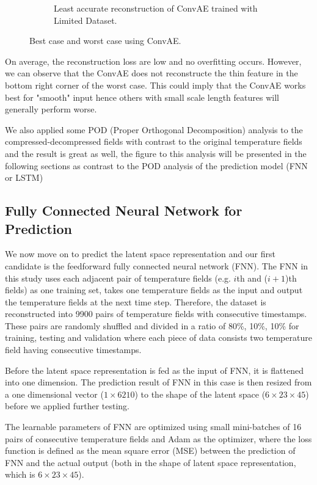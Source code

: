 \begin{figure}[H]
\begin{subfigure}{0.45\textwidth}
    \caption{Least accurate reconstruction of ConvAE trained with Limited Dataset.}
\end{subfigure}     
\caption{Best case and worst case using ConvAE.}
\label{figure:ConvAE_limited_best_worst}
\end{figure}


On average, the reconstruction loss are low and no overfitting occurs. However, we can observe that the ConvAE does not reconstructe the thin feature in the bottom right corner of the worst case. This could imply that the ConvAE works best for "smooth" input hence others with small scale length features will generally perform worse.

We also applied some POD (Proper Orthogonal Decomposition) analysis to the compressed-decompressed fields with contrast to the original temperature fields and the result is great as well, the figure to this analysis will be presented in the following sections as contrast to the POD analysis of the prediction model (FNN or LSTM) 


\subsection{Fully Connected Neural Network for Prediction}

We now move on to predict the latent space representation and our first candidate is the feedforward fully connected neural network (FNN). The FNN in this study uses each adjacent pair of temperature fields (e.g. $i$th and ($i+1$)th fields) as one training set, takes one temperature fields as the input and output the temperature fields at the next time step. Therefore, the dataset is reconstructed into 9900 pairs of temperature fields with consecutive timestamps. These pairs are randomly shuffled and divided in a ratio of 80\%, 10\%, 10\% for training, testing and validation where each piece of data consists two temperature field having consecutive timestamps.

Before the latent space representation is fed as the input of FNN, it is flattened into one dimension. The prediction result of FNN in this case is then resized from a one dimensional vector ($1 \times 6210$) to the shape of the latent space ($6 \times 23 \times 45$) before we applied further testing.

The learnable parameters of FNN are optimized using small mini-batches of 16 pairs of consecutive temperature fields and Adam as the optimizer, where the loss function is defined as the mean square error (MSE) between the prediction of FNN and the actual output (both in the shape of latent space representation, which is $6 \times 23 \times 45$).

